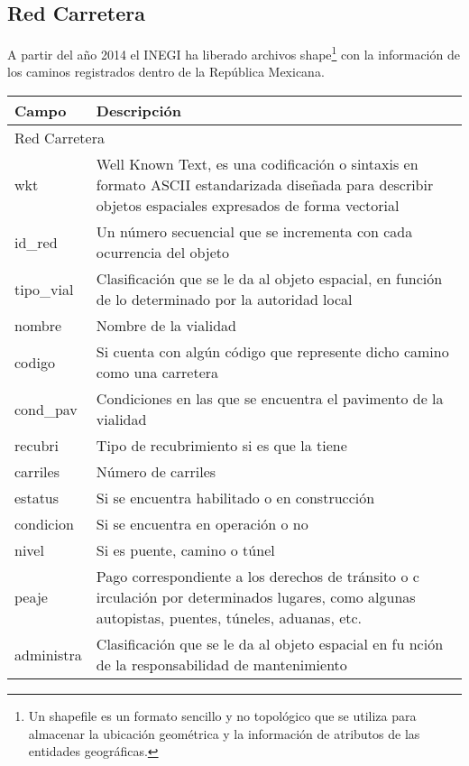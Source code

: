 \pagebreak
\subsection{Red Carretera}
A partir del año 2014 el INEGI ha liberado archivos shape\footnote{Un shapefile es un formato sencillo y no topológico que se utiliza para almacenar la ubicación geométrica y la información de atributos de las entidades geográficas.} con la información de los caminos registrados dentro de la República Mexicana.

\begin{longtable}{|p{8cm}|p{8cm}|}
    \hline
    \hline
    Campo  & Descripción\\
    \hline
    \multicolumn{2}{l}{Red Carretera}\\
    \hline
    wkt &  Well Known Text, es una codificación o sintaxis en formato ASCII estandarizada diseñada para describir objetos espaciales expresados de forma vectorial\\
    \hline
    id\_red & Un número secuencial que se incrementa con cada ocurrencia del objeto\\
    \hline
    tipo\_vial & Clasificación que se le da al objeto espacial, en función de lo determinado por la autoridad local\\
    \hline
    nombre & Nombre de la vialidad\\
    \hline
    codigo & Si cuenta con algún código que represente dicho camino como una carretera\\
    \hline
    cond\_pav & Condiciones en las que se encuentra el pavimento de la vialidad\\
    \hline
    recubri & Tipo de recubrimiento si es que la tiene\\
    \hline
    carriles & Número de carriles\\
    \hline
    estatus & Si se encuentra habilitado o en construcción\\
    \hline
    condicion & Si se encuentra en operación o no\\
    \hline
    nivel & Si es puente, camino o túnel\\
    \hline
    peaje & Pago  correspondiente  a  los  derechos  de  tránsito  o  c
irculación  por  determinados  lugares,  como algunas autopistas, puentes, túneles, aduanas, etc.\\
    \hline
    administra & Clasificación  que  se  le  da  al  objeto  espacial  en  fu
nción  de  la  responsabilidad  de mantenimiento\\
    \hline

\end{longtable}
